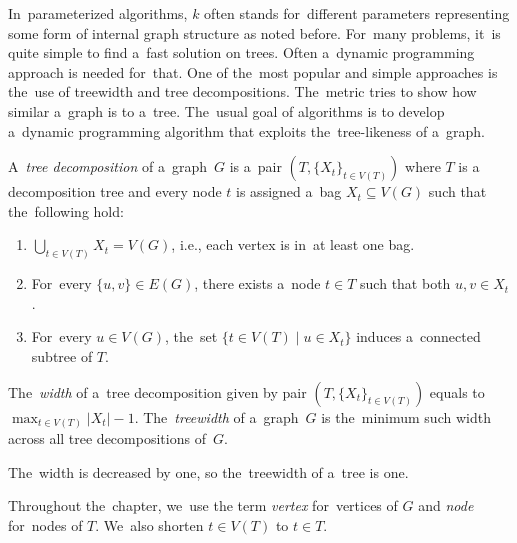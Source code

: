 In~parameterized algorithms, \( k \) often stands for~different parameters
representing some form of internal graph structure as noted before.
%
For~many problems, it~is quite simple to find a~fast solution on trees.
Often a~dynamic programming approach is needed for~that.
%
One of the~most popular and simple approaches
is the~use of treewidth and tree decompositions.
The~metric tries to show how similar a~graph is to a~tree.
%
The~usual goal of algorithms is to develop a~dynamic programming algorithm
that exploits the~tree-likeness of a~graph.

%
\begin{definition}
	A~\emph{tree decomposition} of a~graph~\( G \) is
	a~pair \( (T, {\{X_t\}}_{t \in V ( T )}) \)
	where \( T \) is a decomposition tree and every node \( t \)
	is assigned a~bag \( X_t \subseteq V(G) \) such that the~following hold:
	\begin{enumerate}
		\item \( \bigcup_{t \in V(T)} X_t = V(G) \),
		      i.e., each vertex is in~at least one bag.
		\item For~every \( \{u,v\} \in E(G) \), there exists
		      a~node \( t \in T \) such that both \( u, v \in X_t \).
		\item For~every \( u \in V(G) \),
		      the~set \( \{t \in V(T) \mid u \in X_t\} \)
		      induces a~connected subtree of \( T \).
	\end{enumerate}
\end{definition}
%
\begin{definition}
	The~\emph{width} of a~tree decomposition given by pair
	\( (T, {\{X_t\}}_{t \in V ( T )}) \)
	equals to \( \max_{t\in V(T)} |X_t| - 1 \).
	The~\emph{treewidth} of a~graph~\( G \) is the~minimum such width
	across all tree decompositions of~\( G \).
\end{definition}
%
The~width is decreased by one, so the~treewidth of a~tree is one.

Throughout the~chapter, we~use the term \emph{vertex} for~vertices of \( G \)
and \emph{node} for~nodes of \( T \).
We~also shorten \( t \in V(T) \) to \( t \in T \).

